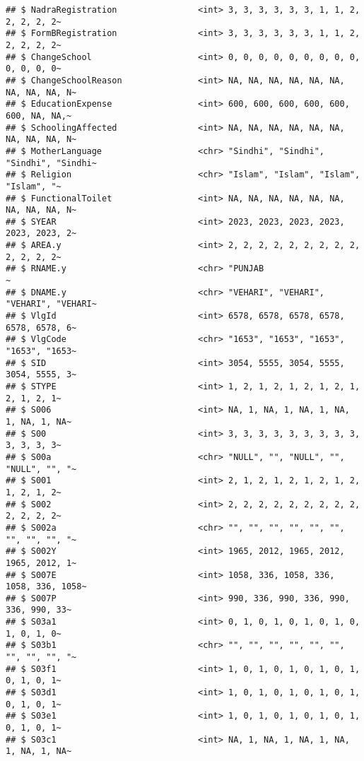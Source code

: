 \documentclass[
]{article}
\begin{document}
\begin{verbatim}
## $ NadraRegistration                <int> 3, 3, 3, 3, 3, 3, 1, 1, 2, 2, 2, 2, 2~
## $ FormBRegistration                <int> 3, 3, 3, 3, 3, 3, 1, 1, 2, 2, 2, 2, 2~
## $ ChangeSchool                     <int> 0, 0, 0, 0, 0, 0, 0, 0, 0, 0, 0, 0, 0~
## $ ChangeSchoolReason               <int> NA, NA, NA, NA, NA, NA, NA, NA, NA, N~
## $ EducationExpense                 <int> 600, 600, 600, 600, 600, 600, NA, NA,~
## $ SchoolingAffected                <int> NA, NA, NA, NA, NA, NA, NA, NA, NA, N~
## $ MotherLanguage                   <chr> "Sindhi", "Sindhi", "Sindhi", "Sindhi~
## $ Religion                         <chr> "Islam", "Islam", "Islam", "Islam", "~
## $ FunctionalToilet                 <int> NA, NA, NA, NA, NA, NA, NA, NA, NA, N~
## $ SYEAR                            <int> 2023, 2023, 2023, 2023, 2023, 2023, 2~
## $ AREA.y                           <int> 2, 2, 2, 2, 2, 2, 2, 2, 2, 2, 2, 2, 2~
## $ RNAME.y                          <chr> "PUNJAB                              ~
## $ DNAME.y                          <chr> "VEHARI", "VEHARI", "VEHARI", "VEHARI~
## $ VlgId                            <int> 6578, 6578, 6578, 6578, 6578, 6578, 6~
## $ VlgCode                          <chr> "1653", "1653", "1653", "1653", "1653~
## $ SID                              <int> 3054, 5555, 3054, 5555, 3054, 5555, 3~
## $ STYPE                            <int> 1, 2, 1, 2, 1, 2, 1, 2, 1, 2, 1, 2, 1~
## $ S006                             <int> NA, 1, NA, 1, NA, 1, NA, 1, NA, 1, NA~
## $ S00                              <int> 3, 3, 3, 3, 3, 3, 3, 3, 3, 3, 3, 3, 3~
## $ S00a                             <chr> "NULL", "", "NULL", "", "NULL", "", "~
## $ S001                             <int> 2, 1, 2, 1, 2, 1, 2, 1, 2, 1, 2, 1, 2~
## $ S002                             <int> 2, 2, 2, 2, 2, 2, 2, 2, 2, 2, 2, 2, 2~
## $ S002a                            <chr> "", "", "", "", "", "", "", "", "", "~
## $ S002Y                            <int> 1965, 2012, 1965, 2012, 1965, 2012, 1~
## $ S007E                            <int> 1058, 336, 1058, 336, 1058, 336, 1058~
## $ S007P                            <int> 990, 336, 990, 336, 990, 336, 990, 33~
## $ S03a1                            <int> 0, 1, 0, 1, 0, 1, 0, 1, 0, 1, 0, 1, 0~
## $ S03b1                            <chr> "", "", "", "", "", "", "", "", "", "~
## $ S03f1                            <int> 1, 0, 1, 0, 1, 0, 1, 0, 1, 0, 1, 0, 1~
## $ S03d1                            <int> 1, 0, 1, 0, 1, 0, 1, 0, 1, 0, 1, 0, 1~
## $ S03e1                            <int> 1, 0, 1, 0, 1, 0, 1, 0, 1, 0, 1, 0, 1~
## $ S03c1                            <int> NA, 1, NA, 1, NA, 1, NA, 1, NA, 1, NA~

\end{verbatim}
\end{document}
